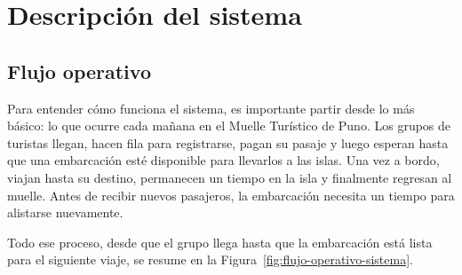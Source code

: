 \documentclass[12pt,a4paper]{article}
\begin{document}
\section{Descripción del sistema}

\subsection{Flujo operativo}

Para entender cómo funciona el sistema, es importante partir desde lo más
básico: lo que ocurre cada mañana en el Muelle Turístico de Puno. Los
grupos de turistas llegan, hacen fila para registrarse, pagan su pasaje y
luego esperan hasta que una embarcación esté disponible para llevarlos a
las islas. Una vez a bordo, viajan hasta su destino, permanecen un tiempo
en la isla y finalmente regresan al muelle. Antes de recibir nuevos
pasajeros, la embarcación necesita un tiempo para alistarse nuevamente.

Todo ese proceso, desde que el grupo llega hasta que la embarcación está
lista para el siguiente viaje, se resume en la Figura~\ref{fig:flujo-operativo-sistema}.
\end{document}
